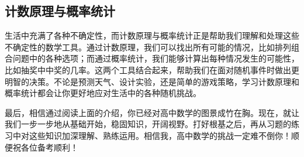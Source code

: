 \subsection{计数原理与概率统计}

生活中充满了各种不确定性，而计数原理与概率统计正是帮助我们理解和处理这些不确定性的数学工具。通过计数原理，我们可以找出所有可能的情况，比如排列组合问题中的各种选项；而通过概率统计，我们能够计算出每种情况发生的可能性，比如抽奖中中奖的几率。这两个工具结合起来，帮助我们在面对随机事件时做出更明智的决策。不论是预测天气、设计实验，还是简单的游戏策略，学习计数原理和概率统计都会让你更好地应对生活中的各种随机挑战。

最后，相信通过阅读上面的介绍，你已经对高中数学的图景成竹在胸。现在，就让我们一步一步地从基础开始，稳固知识，开阔视野。打好根基之后，再从习题的练习中对这些知识加深理解、熟练运用。相信我，高中数学的挑战一定难不倒你！顺便祝各位备考顺利！










